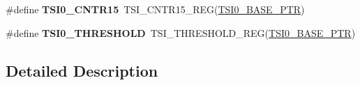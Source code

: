 \begin{DoxyCompactItemize}
\item 
\hypertarget{group___t_s_i___register___accessor___macros_ga82d9eb7784107b55add2e6abc0e2ff2e}{}\#define {\bfseries T\+S\+I0\+\_\+\+C\+N\+T\+R15}~T\+S\+I\+\_\+\+C\+N\+T\+R15\+\_\+\+R\+E\+G(\hyperlink{group___t_s_i___peripheral_gaf98ea1cd15559446e0cfc1ae177751f6}{T\+S\+I0\+\_\+\+B\+A\+S\+E\+\_\+\+P\+T\+R})\label{group___t_s_i___register___accessor___macros_ga82d9eb7784107b55add2e6abc0e2ff2e}

\item 
\hypertarget{group___t_s_i___register___accessor___macros_gacb58ac9e8fdf37c03ddaf95985740d18}{}\#define {\bfseries T\+S\+I0\+\_\+\+T\+H\+R\+E\+S\+H\+O\+L\+D}~T\+S\+I\+\_\+\+T\+H\+R\+E\+S\+H\+O\+L\+D\+\_\+\+R\+E\+G(\hyperlink{group___t_s_i___peripheral_gaf98ea1cd15559446e0cfc1ae177751f6}{T\+S\+I0\+\_\+\+B\+A\+S\+E\+\_\+\+P\+T\+R})\label{group___t_s_i___register___accessor___macros_gacb58ac9e8fdf37c03ddaf95985740d18}

\end{DoxyCompactItemize}


\subsection{Detailed Description}
